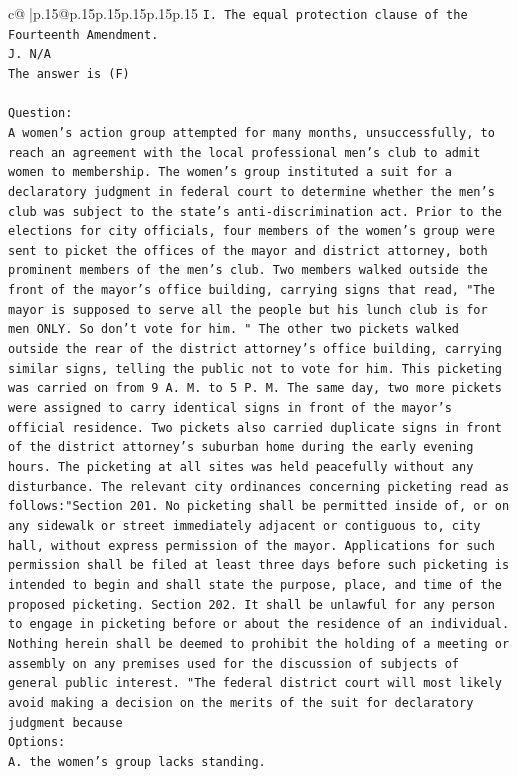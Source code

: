 \documentclass{article}
\begin{document}
{\begin{supertabular}{c@{$\;$}|p{.15\linewidth}@{}p{.15\linewidth}p{.15\linewidth}p{.15\linewidth}p{.15\linewidth}p{.15\linewidth}}
{{{\texttt{I. The equal protection clause of the Fourteenth Amendment.} \\
\texttt{J. N/A} \\
\texttt{The answer is (F)} \\
\\ 
\texttt{Question:} \\
\texttt{A women's action group attempted for many months, unsuccessfully, to reach an agreement with the local professional men's club to admit women to membership. The women's group instituted a suit for a declaratory judgment in federal court to determine whether the men's club was subject to the state's anti{-}discrimination act. Prior to the elections for city officials, four members of the women's group were sent to picket the offices of the mayor and district attorney, both prominent members of the men's club. Two members walked outside the front of the mayor's office building, carrying signs that read, "The mayor is supposed to serve all the people but his lunch club is for men ONLY. So don't vote for him. " The other two pickets walked outside the rear of the district attorney's office building, carrying similar signs, telling the public not to vote for him. This picketing was carried on from 9 A. M. to 5 P. M. The same day, two more pickets were assigned to carry identical signs in front of the mayor's official residence. Two pickets also carried duplicate signs in front of the district attorney's suburban home during the early evening hours. The picketing at all sites was held peacefully without any disturbance. The relevant city ordinances concerning picketing read as follows:"Section 201. No picketing shall be permitted inside of, or on any sidewalk or street immediately adjacent or contiguous to, city hall, without express permission of the mayor. Applications for such permission shall be filed at least three days before such picketing is intended to begin and shall state the purpose, place, and time of the proposed picketing. Section 202. It shall be unlawful for any person to engage in picketing before or about the residence of an individual. Nothing herein shall be deemed to prohibit the holding of a meeting or assembly on any premises used for the discussion of subjects of general public interest. "The federal district court will most likely avoid making a decision on the merits of the suit for declaratory judgment because} \\
\texttt{Options:} \\
\texttt{A. the women's group lacks standing.} \\
}}}
\end{supertabular}}
\end{document}
